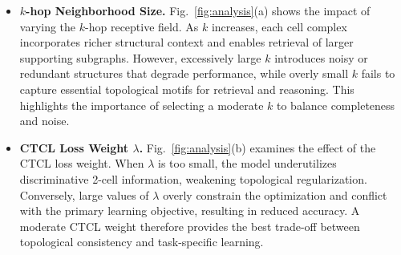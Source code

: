 \begin{itemize}
    \item \textbf{$k$-hop Neighborhood Size.}  
    Fig.~\ref{fig:analysis}(a) shows the impact of varying the $k$-hop
    receptive field. As $k$ increases, each cell complex incorporates
    richer structural context and enables retrieval of larger supporting
    subgraphs. However, excessively large $k$ introduces noisy or redundant
    structures that degrade performance, while overly small $k$ fails to
    capture essential topological motifs for retrieval and reasoning. This
    highlights the importance of selecting a moderate $k$ to balance
    completeness and noise.

    \item \textbf{CTCL Loss Weight $\lambda$.}  
    Fig.~\ref{fig:analysis}(b) examines the effect of the CTCL loss weight.
    When $\lambda$ is too small, the model underutilizes discriminative
    2-cell information, weakening topological regularization. Conversely,
    large values of $\lambda$ overly constrain the optimization and conflict
    with the primary learning objective, resulting in reduced accuracy. A
    moderate CTCL weight therefore provides the best trade-off between
    topological consistency and task-specific learning.
\end{itemize}








